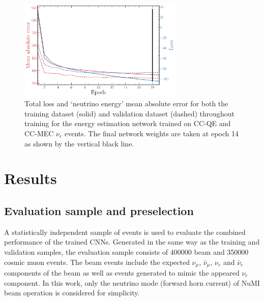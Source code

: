 \begin{figure} %
    \includegraphics[width=0.7\textwidth]{diagrams/6-cvn/chipsnet/final_energy_history.pdf}
    \caption[Loss and mean absolute error throughout training for the beam classification network.]
    {Total loss and `neutrino energy' mean absolute error for both the training dataset (solid)
        and validation dataset (dashed) throughout training for the energy estimation network
        trained on CC-QE and CC-MEC $\nu_{e}$ events. The final network weights are taken at epoch
        14 as shown by the vertical black line.}
    \label{fig:final_energy_history}
\end{figure}

\section{Results} %
\label{sec:cvn_results} %

\subsection{Evaluation sample and preselection} %
\label{sec:cvn_results_sample} %

A statistically independent sample of events is used to evaluate the combined performance of the
trained CNNs. Generated in the same way as the training and validation samples, the evaluation
sample consists of 400000 beam and 350000 cosmic muon events. The beam events include the expected
$\nu_{\mu}$, $\bar{\nu}_{\mu}$, $\nu_{e}$ and $\bar{\nu}_{e}$ components of the beam as well as
events generated to mimic the appeared $\nu_{e}$ component. In this work, only the neutrino mode
(forward horn current) of NuMI beam operation is considered for simplicity.

